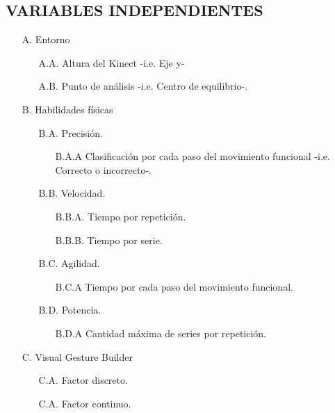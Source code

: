 \subsection{VARIABLES INDEPENDIENTES}
\begin{enumerate}
   \item[A.] Entorno
    \begin{enumerate}
       \item[A.A.] Altura del Kinect -i.e. Eje y-
       \item[A.B.] Punto de an\'alisis -i.e. Centro de equilibrio-.
   \end{enumerate}
   \item[B.] Habilidades f\'isicas
   \begin{enumerate}
   		\item[B.A.] Precisi\'on.
   		\begin{enumerate}
   			\item[B.A.A] Clasificaci\'on por cada paso del movimiento funcional -i.e. Correcto o incorrecto-.
   		\end{enumerate}
   		\item[B.B.] Velocidad.
   		\begin{enumerate}
   			\item[B.B.A.] Tiempo por repetici\'on.
   			\item[B.B.B.] Tiempo por serie.
   		\end{enumerate}
   		\item[B.C.] Agilidad.
   		\begin{enumerate}
   			\item[B.C.A] Tiempo por cada paso del movimiento funcional.
   		\end{enumerate}
   		\item[B.D.] Potencia.
   		\begin{enumerate}
   			\item[B.D.A] Cantidad m\'axima de series por repetici\'on.
   		\end{enumerate}
  \end{enumerate}
  \item[C.] Visual Gesture Builder
  \begin{enumerate}
  	\item[C.A.] Factor discreto.
  	\item[C.A.] Factor continuo.
  \end{enumerate}
\end{enumerate}
